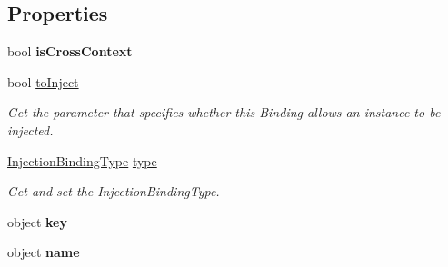 \subsection*{Properties}
\begin{DoxyCompactItemize}
\item 
\hypertarget{interfacestrange_1_1extensions_1_1injector_1_1api_1_1_i_injection_binding_a964dae4babe47419ece25ce7df016401}{bool {\bfseries is\-Cross\-Context}}\label{interfacestrange_1_1extensions_1_1injector_1_1api_1_1_i_injection_binding_a964dae4babe47419ece25ce7df016401}

\item 
\hypertarget{interfacestrange_1_1extensions_1_1injector_1_1api_1_1_i_injection_binding_accffa605c37073081890281cc14d1c12}{bool \hyperlink{interfacestrange_1_1extensions_1_1injector_1_1api_1_1_i_injection_binding_accffa605c37073081890281cc14d1c12}{to\-Inject}}\label{interfacestrange_1_1extensions_1_1injector_1_1api_1_1_i_injection_binding_accffa605c37073081890281cc14d1c12}

\begin{DoxyCompactList}\small\item\em Get the parameter that specifies whether this Binding allows an instance to be injected. \end{DoxyCompactList}\item 
\hyperlink{namespacestrange_1_1extensions_1_1injector_1_1api_aaf5414484d7eccb5c502984bd70549ae}{Injection\-Binding\-Type} \hyperlink{interfacestrange_1_1extensions_1_1injector_1_1api_1_1_i_injection_binding_ab79532f96a6a17f831559143066fed78}{type}
\begin{DoxyCompactList}\small\item\em Get and set the Injection\-Binding\-Type. \end{DoxyCompactList}\item 
\hypertarget{interfacestrange_1_1extensions_1_1injector_1_1api_1_1_i_injection_binding_a44a79fe00fa37f91656098210db62d31}{object {\bfseries key}}\label{interfacestrange_1_1extensions_1_1injector_1_1api_1_1_i_injection_binding_a44a79fe00fa37f91656098210db62d31}

\item 
\hypertarget{interfacestrange_1_1extensions_1_1injector_1_1api_1_1_i_injection_binding_aa327532938e26bccb3d4c2ce8b5c15fb}{object {\bfseries name}}\label{interfacestrange_1_1extensions_1_1injector_1_1api_1_1_i_injection_binding_aa327532938e26bccb3d4c2ce8b5c15fb}


\end{DoxyCompactItemize}
